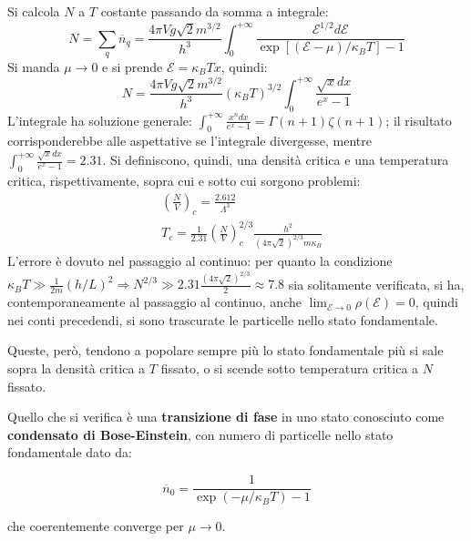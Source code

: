 \documentclass[10pt, a4paper]{scrartcl}
\numberwithin{equation}{subsection}
\theoremstyle{style1}
\newenvironment{boxenv}[1][]{
    \begin{eqbox}[#1]
    }{
   \end{eqbox}
}
\begin{document}
Si calcola $N$ a $T$ costante passando da somma a integrale:
\[
N = \sum_{q}^{} \overline{n}_q = \frac{4\pi V g \sqrt{2} m^{3 / 2} }{h^3}\int_{0} ^{+\infty} \frac{\mathscr{E}^{1 / 2} d\mathscr{E}}{\exp\left[ (\mathscr{E}-\mu ) / \kappa _B T \right] - 1}
\] 
Si manda $\mu \to 0$ e si prende $\mathscr{E} = \kappa _B T x$, quindi:
\[
N = \frac{4\pi V g \sqrt{2} m^{3 / 2} }{h^3} (\kappa _B T)^{3 / 2} \int_{0} ^{+\infty}  \frac{\sqrt{x} dx}{e^x - 1}
\] 
L'integrale ha soluzione generale: $\int_{0} ^{+\infty} \frac{x^n dx}{e^x - 1} = \Gamma(n+1) \zeta(n+1)$;
il risultato corrisponderebbe alle aspettative se l'integrale divergesse, mentre $\int_{0} ^{+\infty} \frac{\sqrt{x} dx}{e^x - 1} = 2.31$. 
Si definiscono, quindi, una densit\`a critica e una temperatura critica, rispettivamente, sopra cui e sotto cui sorgono problemi:
\begin{equation}
	\begin{split}
		& \left(\frac{N}{V}\right) _c = \frac{2.612}{\Lambda ^3}\\
		& T_c = \frac{1}{2.31} \left(\frac{N}{V}\right) _c^{2 / 3} \frac{h^2}{(4\pi \sqrt{2} )^{2/3} m\kappa _B }
	\end{split}
\end{equation}
L'errore \`e dovuto nel passaggio al continuo: per quanto la condizione $\kappa _B T \gg \frac{1}{2m} (h / L)^2\Rightarrow N^{2 / 3} \gg 2.31 \frac{(4\pi \sqrt{2} )^{2/3} }{2} \approx 7.8$ sia solitamente verificata, si ha, contemporaneamente al passaggio al continuo, anche $\lim_{\mathscr{E} \to 0} \rho (\mathscr{E}) =0$, quindi nei conti precedendi, si sono trascurate le particelle nello stato fondamentale.

Queste, per\`o, tendono a popolare sempre pi\`u lo stato fondamentale pi\`u si sale sopra la densit\`a critica a $T$ fissato, o si scende sotto temperatura critica a $N$ fissato.

Quello che si verifica \`e una \textbf{transizione di fase} in uno stato conosciuto come \textbf{condensato di Bose-Einstein}, con numero di particelle nello stato fondamentale dato da:
\begin{boxenv}[]
\begin{equation}
	\overline{n}_0 = \frac{1}{\exp(-\mu / \kappa _B T) - 1}
\end{equation}
\end{boxenv}
\noindent che coerentemente converge per $\mu \to 0$.
\end{document}
